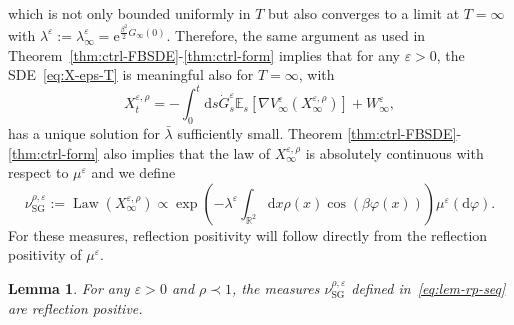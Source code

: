 \documentclass[11pt, a4paper]{scrartcl}
\numberwithin{equation}{section}
\theoremstyle{plain}
\newtheorem{lemma}[foo]{Lemma}
\theoremstyle{remark}
\newcommand{\assign}{:=}
\newcommand{\mathd}{\mathrm{d}}
\newcommand{\mathe}{\mathrm{e}}
\newcommand{\tmop}[1]{\ensuremath{\operatorname{#1}}}
\begin{document}
which is not only bounded uniformly in $T$ but also converges to a limit at $T
= \infty$ with $\lambda^{\varepsilon} \assign \lambda_{\infty}^{\varepsilon} =
\mathe^{\frac{\beta^2}{2} G_{\infty} (0)}$. Therefore, the same argument as
used in Theorem~\ref{thm:ctrl-FBSDE}-\ref{thm:ctrl-form} implies that for any
$\varepsilon > 0$, the SDE~\eqref{eq:X-eps-T} is meaningful also for $T =
\infty$, with
\begin{equation}
  X^{\varepsilon, \rho}_t = - \int_0^t \mathd s \dot{G}_s^{\varepsilon} \mathbb{E}_s
  [\nabla V_{\infty}^{\varepsilon} (X^{\varepsilon, \rho}_{\infty})] +
  W_{\infty}^{\varepsilon}, \label{eq:SDE-V-RP}
\end{equation}
has a unique solution for $\bar{\lambda}$ sufficiently small. Theorem
\ref{thm:ctrl-FBSDE}-\ref{thm:ctrl-form} also implies that the law of
$X^{\varepsilon, \rho}_{\infty}$ is absolutely continuous with respect to
$\mu^{\varepsilon}$ and we define
\begin{equation}
  \nu_{\tmop{SG}}^{\rho, \varepsilon} \assign \tmop{Law}
  (X^{\varepsilon, \rho}_{\infty}) \propto \exp \left( - \lambda^{\varepsilon}
  \int_{\mathbb{R}^2} \mathd x \rho (x) \cos (\beta \varphi (x)) \right)
  \mu^{\varepsilon} (\mathd \varphi) . \label{eq:lem-rp-seq}
\end{equation}
For these measures, reflection positivity will follow directly from the
reflection positivity of $\mu^{\varepsilon}$.

\begin{lemma}
  For any $\varepsilon > 0$ and $\rho \prec 1$, the measures
  $\nu_{\tmop{SG}}^{\rho, \varepsilon}$ defined in~\eqref{eq:lem-rp-seq} are
  reflection positive.
\end{lemma}
\end{document}
